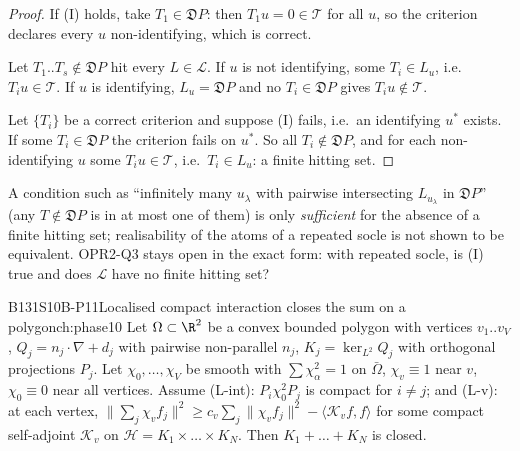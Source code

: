 \begin{proof}
If (I) holds, take $T_1\in\mathfrak DP$: then $T_1u=0\in\mathcal T$ for all $u$, so the criterion declares every $u$ non-identifying, which is correct.

Let $T_1..T_s\notin\mathfrak DP$ hit every $L\in\mathcal L$. If $u$ is not identifying, some $T_i\in L_u$, i.e.\ $T_iu\in\mathcal T$. If $u$ is identifying, $L_u=\mathfrak DP$ and no $T_i\in\mathfrak DP$ gives $T_iu\notin\mathcal T$.

Let $\{T_i\}$ be a correct criterion and suppose (I) fails, i.e.\ an identifying $u^*$ exists. If some $T_i\in\mathfrak DP$ the criterion fails on $u^*$. So all $T_i\notin\mathfrak DP$, and for each non-identifying $u$ some $T_iu\in\mathcal T$, i.e.\ $T_i\in L_u$: a finite hitting set.

\end{proof}

\begin{caution}[title=What it does and does not give]
A condition such as ``infinitely many $u_\lambda$ with pairwise intersecting $L_{u_\lambda}$ in $\mathfrak DP$'' (any $T\notin\mathfrak DP$ is in at most one of them) is only \emph{sufficient} for the absence of a finite hitting set; realisability of the atoms of a repeated socle is not shown to be equivalent. OPR2-Q3 stays open in the exact form: with repeated socle, is (I) true and does $\mathcal L$ have no finite hitting set?
\end{caution}

\begin{dimcard}{B131}{S10B-P11}{Localised compact interaction closes the sum on a polygon}{\pw}{ch:phase10}
Let $\Omega\subset\R^2$ be a convex bounded polygon with vertices $v_1..v_V$, $Q_j=n_j\cdot\nabla+d_j$ with pairwise non-parallel $n_j$, $K_j=\ker_{L^2}Q_j$ with orthogonal projections $P_j$. Let $\chi_0,\dots,\chi_V$ be smooth with $\sum\chi_\alpha^2=1$ on $\bar\Omega$, $\chi_v\equiv1$ near $v$, $\chi_0\equiv0$ near all vertices. Assume (L-int): $P_i\chi_0^2P_j$ is compact for $i\ne j$; and (L-v): at each vertex, $\|\sum_j\chi_vf_j\|^2\ge c_v\sum_j\|\chi_vf_j\|^2-\langle\mathcal K_vf,f\rangle$ for some compact self-adjoint $\mathcal K_v$ on $\mathcal H=K_1\times\dots\times K_N$. Then $K_1+\dots+K_N$ is closed.
\end{dimcard}

